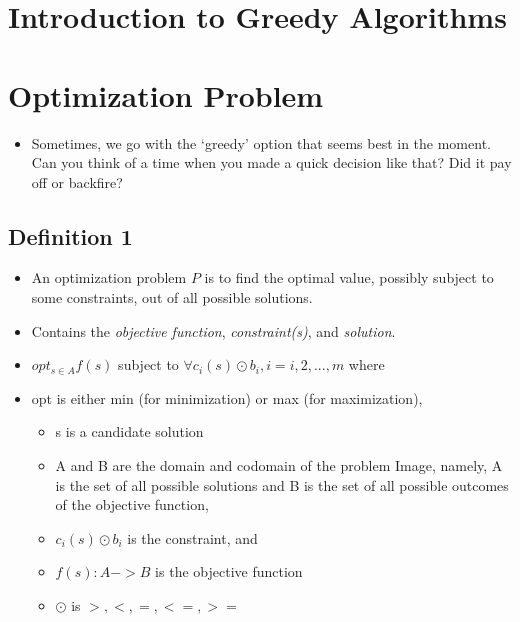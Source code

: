 \documentclass[
  letterpaper,
  DIV=11,
  numbers=noendperiod]{scrreprt}
\providecommand{\tightlist}{%
  \setlength{\itemsep}{0pt}\setlength{\parskip}{0pt}}\usepackage{longtable,booktabs,array}
\begin{document}
\chapter{Introduction to Greedy
Algorithms}\label{introduction-to-greedy-algorithms}


\chapter{Optimization Problem}\label{optimization-problem}

\begin{itemize}
\tightlist
\item
  Sometimes, we go with the `greedy' option that seems best in the
  moment. Can you think of a time when you made a quick decision like
  that? Did it pay off or backfire?
\end{itemize}

\section{Definition 1}\label{definition-1}

\begin{itemize}
\item
  An optimization problem \(P\) is to find the optimal value, possibly
  subject to some constraints, out of all possible solutions.
\item
  Contains the \emph{objective function}, \emph{constraint(s)}, and
  \emph{solution}.
\item
  \(opt_{s \in A} f(s)\) subject to
  \(\forall c_i(s) \odot b_i, i=i, 2, ...,m\) where
\item
  opt is either min (for minimization) or max (for maximization),

  \begin{itemize}
  \tightlist
  \item
    s is a candidate solution
  \item
    A and B are the domain and codomain of the problem Image, namely, A
    is the set of all possible solutions and B is the set of all
    possible outcomes of the objective function,
  \item
    \(c_i(s) \odot b_i\) is the constraint, and
  \item
    \(f(s): A->B\) is the objective function
  \item
    \(\odot\) is \(>, <, =, <=, >=\)
  \end{itemize}
\end{itemize}
\end{document}

